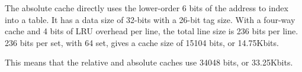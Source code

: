 The absolute cache directly uses the lower-order 6 bits of the address to index into a table. It has a data size of 32-bits with a 26-bit tag size. With a four-way cache and 4 bits of LRU overhead per line, the total line size is 236 bits per line. 236 bits per set, with 64 set, gives a cache size of 15104 bits, or 14.75Kbits.

This means that the relative and absolute caches use 34048 bits, or 33.25Kbits. 
